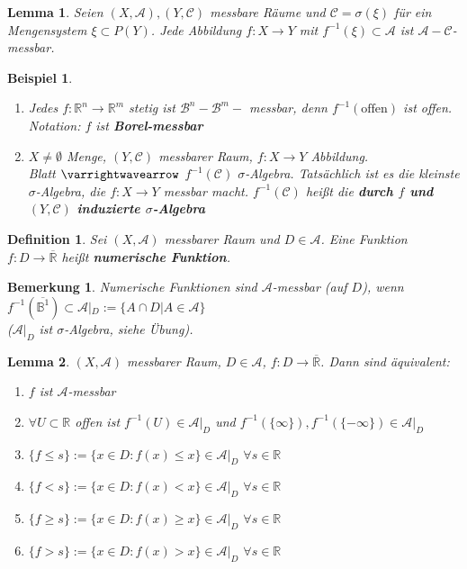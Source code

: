 \documentclass[11pt]{memoir}
\theoremstyle{changebreak}
\newtheorem{Definition}{Definition}[chapter]
\newtheorem{Bemerkung}{Bemerkung}[chapter]
\newtheorem{Beispiel}{Beispiel}[chapter]
\newtheorem{Lemma}{Lemma}[chapter]
\begin{document}
\begin{Lemma}
Seien $(X, \mathscr{A}), (Y, \mathscr{C})$ messbare Räume und $\mathscr{C} = \sigma(\xi)$ für ein Mengensystem $\xi \subset P(Y)$. Jede Abbildung $f: X \rightarrow Y$ mit $f^{-1}(\xi) \subset \mathscr{A}$ ist $\mathscr{A}-\mathscr{C}$-messbar.
\end{Lemma}

\begin{Beispiel}
\begin{enumerate}
	\item Jedes $f: \mathbb{R}^n \rightarrow \mathbb{R}^m$ stetig ist $\mathscr{B}^n-\mathscr{B}^m-$ messbar, denn $f^{-1}(\text{offen})$ ist offen. \\
	\emph{Notation}: $f$ ist \textbf{Borel-messbar}
	\item $X \ne \emptyset$ Menge, $(Y, \mathscr{C})$ messbarer Raum, $f: X \rightarrow Y$ Abbildung. \\
	Blatt $\varrightwavearrow$ $f^{-1}(\mathscr{C})$ $\sigma$-Algebra. Tatsächlich ist es die kleinste $\sigma$-Algebra, die $f: X \rightarrow Y$ messbar macht. $f^{-1}(\mathscr{C})$ heißt die \textbf{durch $f$ und $(Y, \mathscr{C})$ induzierte $\sigma$-Algebra}
\end{enumerate}
\end{Beispiel}

\begin{Definition}
Sei $(X, \mathscr{A})$ messbarer Raum und $D \in \mathscr{A}$. Eine Funktion $f: D \rightarrow \overline{\mathbb{R}}$ heißt \textbf{numerische Funktion}.
\end{Definition}

\begin{Bemerkung}
Numerische Funktionen sind $\mathscr{A}$-messbar (auf $D$), wenn $f^{-1}(\overline{\mathbb{B}^1}) \subset \mathscr{A}|_D:= \{A \cap D |A \in \mathscr{A}\}$ \\
($\mathscr A | _D$ ist $\sigma$-Algebra, siehe Übung).
\end{Bemerkung}

\begin{Lemma}
$(X, \mathscr A)$ messbarer Raum, $D \in \mathscr A$, $f: D \rightarrow \overline {\mathbb R}$. Dann sind äquivalent:
\begin{enumerate}
	\item $f$ ist $\mathscr A$-messbar
	\item $\forall U \subset \mathbb R$ offen ist $f^{-1}(U) \in \mathscr A |_D$ und $f^{-1}(\{\infty\}), f^{-1}(\{-\infty\}) \in \mathscr A |_D$
	\item $\{f \leq s\} := \{x \in D: f(x) \leq x\} \in \mathscr A |_D$ $ \forall s \in \mathbb R$
	\item $\{f < s\} := \{x \in D: f(x) < x\} \in \mathscr A |_D$ $ \forall s \in \mathbb R$
	\item $\{f \geq s\} := \{x \in D: f(x) \geq x\} \in \mathscr A |_D$ $ \forall s \in \mathbb R$
	\item $\{f > s\} := \{x \in D: f(x) > x\} \in \mathscr A |_D$ $ \forall s \in \mathbb R$
\end{enumerate}
\end{Lemma}
\end{document}
